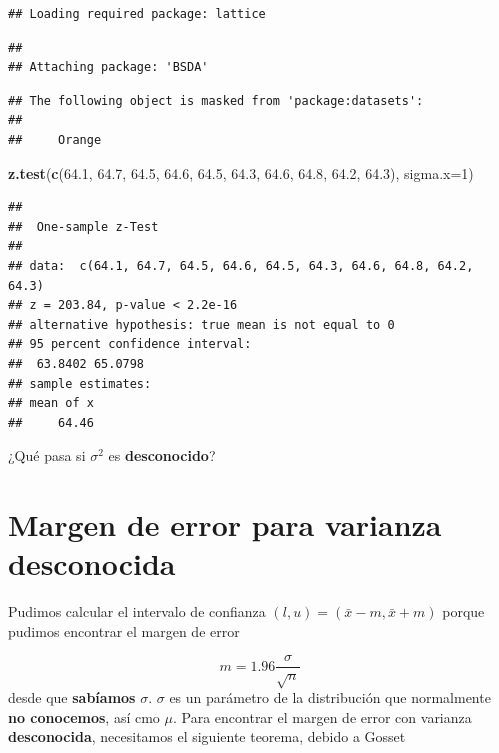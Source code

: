 \documentclass[
]{book}
\newenvironment{Shaded}{\begin{snugshade}}{\end{snugshade}}
\newcommand{\AttributeTok}[1]{\textcolor[rgb]{0.13,0.29,0.53}{#1}}
\newcommand{\DecValTok}[1]{\textcolor[rgb]{0.00,0.00,0.81}{#1}}
\newcommand{\FloatTok}[1]{\textcolor[rgb]{0.00,0.00,0.81}{#1}}
\newcommand{\FunctionTok}[1]{\textcolor[rgb]{0.13,0.29,0.53}{\textbf{#1}}}
\newcommand{\NormalTok}[1]{#1}
\begin{document}
\begin{verbatim}
## Loading required package: lattice
\end{verbatim}

\begin{verbatim}
## 
## Attaching package: 'BSDA'
\end{verbatim}

\begin{verbatim}
## The following object is masked from 'package:datasets':
## 
##     Orange
\end{verbatim}

\begin{Shaded}
\begin{Highlighting}[]
\FunctionTok{z.test}\NormalTok{(}\FunctionTok{c}\NormalTok{(}\FloatTok{64.1}\NormalTok{, }\FloatTok{64.7}\NormalTok{, }\FloatTok{64.5}\NormalTok{, }\FloatTok{64.6}\NormalTok{, }\FloatTok{64.5}\NormalTok{, }\FloatTok{64.3}\NormalTok{, }\FloatTok{64.6}\NormalTok{, }\FloatTok{64.8}\NormalTok{, }\FloatTok{64.2}\NormalTok{, }\FloatTok{64.3}\NormalTok{), }
       \AttributeTok{sigma.x=}\DecValTok{1}\NormalTok{)}
\end{Highlighting}
\end{Shaded}

\begin{verbatim}
## 
##  One-sample z-Test
## 
## data:  c(64.1, 64.7, 64.5, 64.6, 64.5, 64.3, 64.6, 64.8, 64.2, 64.3)
## z = 203.84, p-value < 2.2e-16
## alternative hypothesis: true mean is not equal to 0
## 95 percent confidence interval:
##  63.8402 65.0798
## sample estimates:
## mean of x 
##     64.46
\end{verbatim}

¿Qué pasa si \(\sigma^2\) es \textbf{desconocido}?

\hypertarget{margen-de-error-para-varianza-desconocida}{%
\section{Margen de error para varianza desconocida}\label{margen-de-error-para-varianza-desconocida}}

Pudimos calcular el intervalo de confianza \((l,u)=(\bar{x} -m, \bar{x} +m)\) porque pudimos encontrar el margen de error

\[m=1.96 \frac{\sigma}{\sqrt{n}}\]
desde que \textbf{sabíamos} \(\sigma\). \(\sigma\) es un parámetro de la distribución que normalmente \textbf{no conocemos}, así cmo \(\mu\). Para encontrar el margen de error con varianza \textbf{desconocida}, necesitamos el siguiente teorema, debido a Gosset
\end{document}
